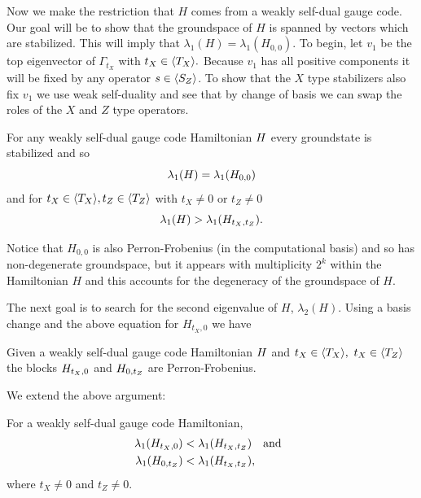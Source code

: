 \documentclass[12pt]{article}
\renewenvironment{framed}
{\begin{samepage}
\MakeFramed{\hsize0.8\linewidth\advance\hsize-\width\FrameRestore}}
{\endMakeFramed\end{samepage}}
\begin{document}
Now we make the restriction that $H$
comes from a weakly self-dual gauge code.
Our goal will be to show that the
groundspace of $H$ is spanned
by vectors which are stabilized.
This will imply that $\lambda_1(H)=\lambda_1(H_{0,0}).$
To begin, let $v_1$ be the top
eigenvector of $\Gamma_{t_X}$ with $t_X\in\langle T_X \rangle.$
Because $v_1$ has all positive components
it will be fixed by  any operator
$s\in\langle S_Z \rangle$.
To show that the $X$ type stabilizers
also fix $v_1$ 
we use weak self-duality
and see that by change of basis
we can swap the roles of the $X$ and $Z$ type operators.
\begin{framed}

For any weakly self-dual gauge code Hamiltonian $H$
every groundstate is stabilized 
and so $$\lambda_1(H) = \lambda_1(H_{0,0})$$
and for $t_X\in\langle T_X \rangle, t_Z\in\langle T_Z \rangle$
with $t_X\ne 0$ or $t_Z\ne 0$
$$
\lambda_1(H) > \lambda_1(H_{t_X,t_Z}).
$$
\end{framed}
Notice that 
$H_{0,0}$ is also Perron-Frobenius (in the computational basis)
and so has non-degenerate
groundspace, but it appears with multiplicity $2^k$ within
the Hamiltonian $H$ and this accounts for the degeneracy of the
groundspace of $H$.



The next goal is to search for
the second eigenvalue of $H$,
$\lambda_2(H).$
Using a basis change and the
above equation for $H_{t_X,0}$
we have
\begin{framed}
Given a weakly self-dual
gauge code Hamiltonian $H$ and
$t_X\in \langle T_X \rangle,\  t_X\in \langle T_Z \rangle$
the blocks $H_{t_X,0}$ and 
$H_{0,t_Z}$ are Perron-Frobenius.
\end{framed}

We extend the above argument:
\begin{framed}
\noindent For a weakly self-dual gauge code
Hamiltonian,
\begin{align*}
\lambda_1(H_{t_X,0}) &< 
    \lambda_1(H_{t_X,t_Z}) \ \ \ \mbox{and}\ \ \\
\lambda_1(H_{0,t_Z}) &< 
    \lambda_1(H_{t_X,t_Z}),
\end{align*}
where $t_X\ne 0$ and $t_Z\ne 0.$
\end{framed}
\end{document}

